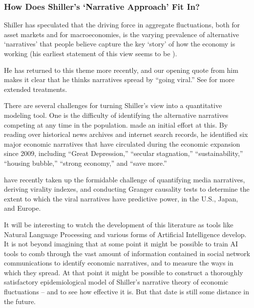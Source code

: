 \subsubsection{How Does Shiller's `Narrative Approach' Fit In?}\label{narrativeApproach}

Shiller has speculated that the driving force in aggregate fluctuations, both for asset markets and for macroeconomies, is the varying prevalence of alternative `narratives' that people believe capture the key `story' of how the economy is working (his earliest statement of this view seems to be \href{https://www.jstor.org/stable/2117915}{\cite{shiller1995conversation}}).

He has returned to this theme more recently, and our opening quote from him makes it clear that he thinks narratives spread by ``going viral.''  See \citep{shiller2017narrative,shiller_narrative_2019} for more extended treatments.

There are several challenges for turning Shiller's view into a quantitative modeling tool.  One is the difficulty of identifying the alternative narratives competing at any time in the population.
\href{https://github.com/iworld1991/EpiExp/blob/master/Literature/shiller2020popular.pdf}{\cite{shiller2020popular}} made an initial effort at this.  By reading over historical news archives and internet search records, he identified six major economic narratives that have circulated during the economic expansion since 2009, including ``Great Depression,'' ``secular stagnation,'' ``sustainability,'' ``housing bubble,'' ``strong economy,'' and ``save more.''

\cite{larsen2019business} have recently taken up the formidable challenge of quantifying media narratives, deriving virality indexes, and conducting
Granger causality tests to determine the extent to which the viral narratives have predictive power, in the U.S., Japan, and Europe.

It will be interesting to watch the development of this literature as tools like Natural Language Processing and various forms of Artificial Intelligence develop.
It is not beyond imagining that at some point it might be possible to train AI tools to comb through the vast amount of information contained in social network communications to identify economic narratives, and to measure the ways in which they spread.  At that point it might be possible to construct a thoroughly satisfactory epidemiological model of Shiller's narrative theory of economic fluctuations -- and to see how effective it is.  But that date is still some distance in the future.



